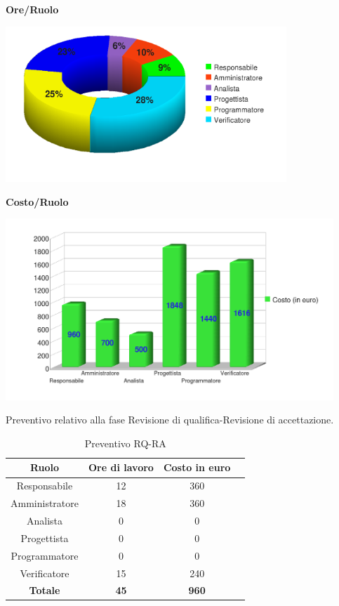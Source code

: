 \begin{center}\textbf{Ore/Ruolo}
\end{center}
\includegraphics[width=300pt]{RPP-RQ_Ore}
\newpage
\begin{center}\textbf{Costo/Ruolo}
\end{center}
\includegraphics[width=350pt]{RPP-RQ_Costi}

Preventivo relativo alla fase Revisione di qualifica-Revisione di accettazione.
\begin{table}[h]
	\begin{center}
		  \begin{tabular}{|c|c|c|c|}
		 \hline 
		 \textbf{Ruolo} & \textbf{Ore di lavoro} & \textbf{Costo in euro}\\
		 \hline
		Responsabile & 12 & 360 \\
		Amministratore & 18 & 360\\
		Analista & 0 & 0\\
		Progettista & 0 & 0\\
		Programmatore & 0 & 0 \\
		Verificatore & 15 & 240\\
        \hline
        \textbf{Totale} & \textbf{45} & \textbf{960}\\
		\hline
		\end{tabular}
	\caption{Preventivo RQ-RA} 
	\label{tab:tabella_RQ-RA}
	\end{center}	
\end{table}


